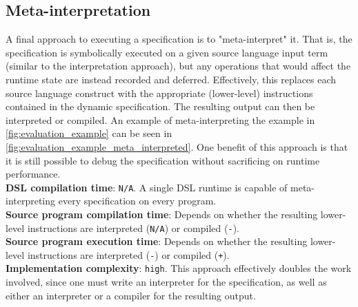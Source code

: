 
\subsection{Meta-interpretation}
A final approach to executing a specification is to "meta-interpret" it. That is, the specification is symbolically executed on a given source language input term (similar to the interpretation approach), but any operations that would affect the runtime state are instead recorded and deferred. Effectively, this replaces each source language construct with the appropriate (lower-level) instructions contained in the dynamic specification. The resulting output can then be interpreted or compiled. An example of meta-interpreting the example in \cref{fig:evaluation_example} can be seen in \cref{fig:evaluation_example_meta_interpreted}. One benefit of this approach is that it is still possible to debug the specification without sacrificing on runtime performance. \\

\noindent
\textbf{\ac{DSL} compilation time}: \texttt{N/A}. A single \ac{DSL} runtime is capable of meta-interpreting every specification on every program.\\
\textbf{Source program compilation time}: Depends on whether the resulting lower-level instructions are interpreted (\texttt{N/A}) or compiled (\texttt{-}).\\
\textbf{Source program execution time}: Depends on whether the resulting lower-level instructions are interpreted (\texttt{-}) or compiled (\texttt{+}). \\
\textbf{Implementation complexity}: \texttt{high}. This approach effectively doubles the work involved, since one must write an interpreter for the specification, as well as either an interpreter or a compiler for the resulting output.

